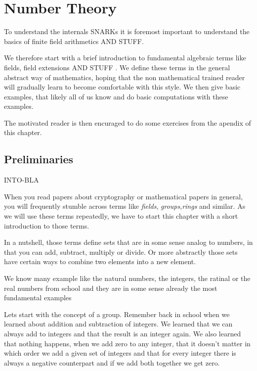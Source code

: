 \chapter{Number Theory}

To understand the internals SNARKs it is foremost important to understand the basics of finite field arithmetics AND STUFF.

We therefore start with a brief introduction to fundamental algebraic terms like fields, field extensions AND STUFF . We define these terms in the general abstract way of mathematics, hoping that the non mathematical trained reader will gradually learn to become comfortable with this style. We then give basic examples, that likely all of us know and do basic computations with these examples. 

The motivated reader is then encuraged to do some exercises from  the apendix of this chapter.

\section{Preliminaries}
INTO-BLA

When you read papers about cryptography or mathematical papers in general, you will frequently stumble across terms like \textit{fields}, \textit{groups},\textit{rings} and similar. As we will use these terms repeatedly, we have to start this chapter with a short introduction to those terms.

In a nutshell, those terms define sets that are in some sense analog to numbers, in that you can add, subtract, multiply or divide. Or more abstractly those sets have certain ways to combine two elements into a new element.

We know many example like the natural numbers, the integers, the ratinal or the real numbers from school and they are in some sense already the most fundamental examples

Lets start with the concept of a group. Remember back in school when we learned about addition and subtraction of integers. We learned that we can always add to integers and that the result is an integer again. We also learned that nothing happens, when we add zero to any integer, that it doesn't matter in which order we add a given set of integers and that for every integer there is always a negative counterpart and if we add both together we get zero. 

